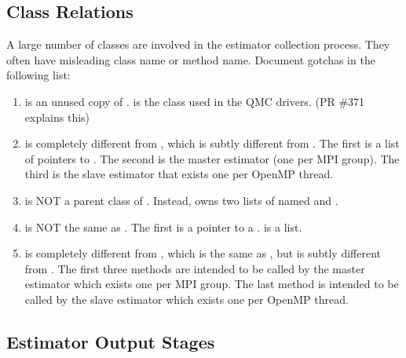 \subsection{Class Relations}
A large number of classes are involved in the estimator collection process. They often have misleading class name or method name. Document gotchas in the following list:
\begin{enumerate}
\item {} is an unused copy of .  is the class used in the QMC drivers. (PR \#371 explains this)
\item {} is completely different from , which is subtly different from . The first is a list of pointers to . The second is the master estimator (one per MPI group). The third is the slave estimator that exists one per OpenMP thread.
\item {} is NOT a parent class of . Instead,  owns two lists of  named  and .
\item {} is NOT the same as . The first is a pointer to a .  is a list.
\item {} is completely different from 
, which is the same as , but is subtly different from . The first three methods are intended to be called by the master estimator which exists one per MPI group. The last method is intended to be called by the slave estimator which exists one per OpenMP thread.
\end{enumerate}

\subsection{Estimator Output Stages}

